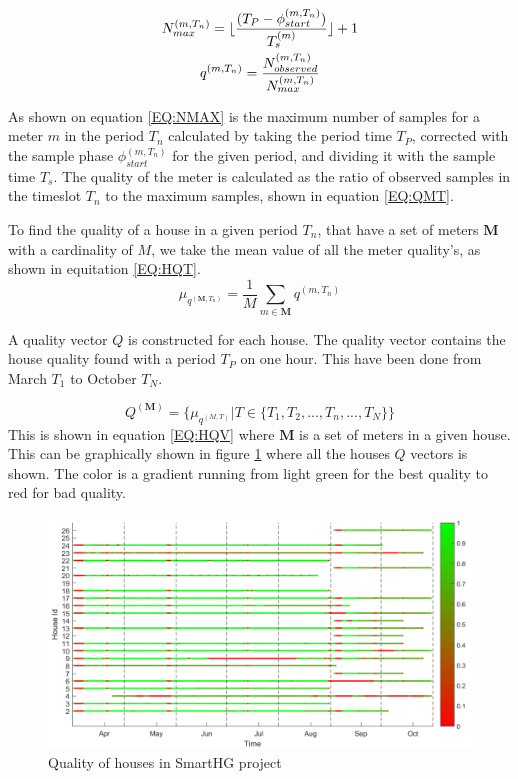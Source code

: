 \begin{gather}
		N_{max}^{(m,T_n)} = \lfloor \frac{(T_{P}-\phi_{start}^{(m,T_n)})}{T_s^{(m)}}\rfloor + 1 \label{EQ:NMAX} \\
		q^{(m,T_n)} = \frac{N_{observed}^{(m,T_n)}}{ N_{max}^{(m,T_n)} } \label{EQ:QMT}
\end{gather}

As shown on equation \ref{EQ:NMAX} is the maximum number of samples for a meter $m$ in the period $T_n$ calculated by taking the period time $T_P$, corrected with the sample phase $\phi_{start}^{(m,T_n)}$ for the given period, and dividing it with the sample time $T_s$. The quality of the meter is calculated as the ratio of observed samples in the timeslot $T_n$ to the maximum samples, shown in equation \ref{EQ:QMT}. 

To find the quality of a house in a given period $T_n$, that have a set of meters $\mathbf{M}$ with a cardinality of $M$, we take the mean value of all the meter quality's, as shown in equitation \ref{EQ:HQT}.  
\begin{equation}
	\mu_{q^{(\mathbf{M},T_n)}} = \frac{1}{M} \sum_{m \in \mathbf{M}} q^{(m,T_n)}
	\label{EQ:HQT}
\end{equation}



A quality vector $Q$ is constructed for each house. The quality vector contains the house quality found with a period $T_P$ on one hour. This have been done from March $T_1$ to October $T_N$. 

\begin{equation}
	Q^{(\mathbf{M})} = \{ \mu_{q^{(M,T)}} | T \in \{T_1, T_2, ... ,T_n,..., T_N  \} \}
	\label{EQ:HQV}
\end{equation}
This is shown in equation \ref{EQ:HQV} where $\mathbf{M}$ is a set of meters in a given house. This can be graphically shown in figure \ref{fig:SmartHGQuality} where all the houses $Q$ vectors is shown. The color is a gradient running from light green for the best quality to red for bad quality.
\begin{figure}[H]
\centering
\includegraphics[width=1\textwidth]{billeder/QualityBig.png}
\caption{Quality of houses in SmartHG project}
\label{fig:SmartHGQuality}
\end{figure} 

